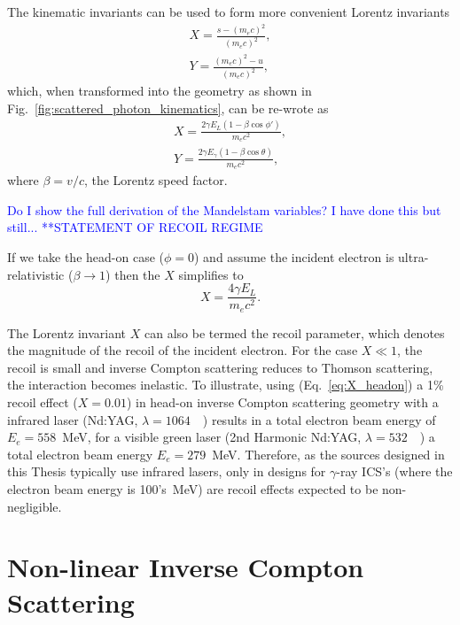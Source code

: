 \documentclass[../main.tex]{subfiles}
\begin{document}
The kinematic invariants can be used to form more convenient Lorentz invariants
\begin{align}
X = \frac{s-\left(m_{e}c\right)^{2}}{\left(m_{e}c\right)^{2}},
\label{eq:X_Mandelstam} \\
Y = \frac{\left(m_{e}c\right)^{2}-u}{\left(m_{e}c\right)^{2}},
\label{eq:Y_Mandelstam}
\end{align}
which, when transformed into the geometry as shown in Fig.~\ref{fig:scattered_photon_kinematics}, can be re-wrote as
\begin{align}
X = \frac{2\gamma E_{L}\left(1-\beta\cos\phi'\right)}{m_{e}c^{2}},
\label{eq:X_geometry} \\
Y = \frac{2\gamma E_{\gamma}\left(1-\beta\cos\theta\right)}{m_{e}c^{2}},
\label{eq:Y_geometry}
\end{align}
where $\beta = v/c$, the Lorentz speed factor.

\textcolor{blue}{Do I show the full derivation of the Mandelstam variables? I have done this but still...}
\textcolor{blue}{**STATEMENT OF RECOIL REGIME}

If we take the head-on case ($\phi = 0$) and  assume the incident electron is ultra-relativistic ($\beta \rightarrow 1$) then the $X$ simplifies to 
\begin{equation}
X = \frac{4\gamma E_{L}}{m_{e}c^{2}}.
\label{eq:X_headon}
\end{equation}

The Lorentz invariant $X$ can also be termed the recoil parameter, which denotes the magnitude of the recoil of the incident electron. For the case $X \ll 1$, the recoil is small and inverse Compton scattering reduces to Thomson scattering, the interaction becomes inelastic. To illustrate, using (Eq.~\ref{eq:X_headon}) a 1\% recoil effect ($X = 0.01$) in head-on inverse Compton scattering geometry with a infrared laser (Nd:YAG, $\lambda = 1064$~\si{\nano\metres}) results in a total electron beam energy of $E_{e} = 558$~\si{\mega\electronvolt}, for a visible green laser (2nd Harmonic Nd:YAG, $\lambda = 532$~\si{\nano\metres}) a total electron beam energy $E_{e} = 279$~\si{\mega\electronvolt}. Therefore, as the sources designed in this Thesis typically use infrared lasers, only in designs for $\gamma$-ray ICS's (where the electron beam energy is 100's~\si{\mega\electronvolt}) are recoil effects expected to be non-negligible.     

\section{Non-linear Inverse Compton Scattering}
\end{document}
